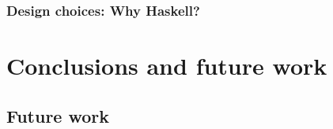 \documentclass[a4paper, twoside]{report}
\begin{document}
\subsection{Design choices: Why Haskell?}

\chapter{Conclusions and future work}
\section{Future work}
% 
% 



\end{document}
